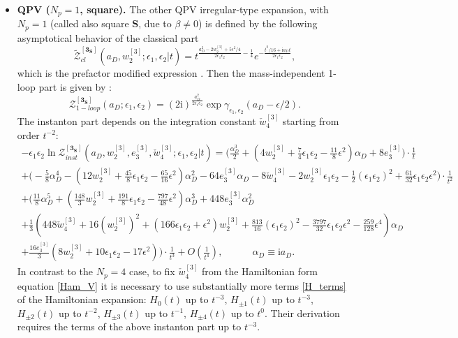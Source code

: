 \documentclass[12pt,a4paper]{article}
\numberwithin{equation}{section}
\newcommand{\ri}{\mathrm{i}}
\newcommand{\D}{\scriptscriptstyle{D}}
\begin{document}
\begin{itemize}
    \item {\bf QPV ($N_p=1$, square).}
The other QPV irregular-type expansion, with $N_p=1$ (called also square $\mathbf{S}$, due to $\beta\neq0$) is defined by the following asymptotical behavior of the classical part 
\begin{equation}
\widetilde{\mathcal{Z}}_{cl}^{[\mathbf{3_S}]}(a_{\D},w_2^{[3]};\epsilon_1,\epsilon_2|t)=t^{\frac{a_{\D}^2-2w_2^{[3]}+5\epsilon^2/4}{2\epsilon_1\epsilon_2}-\frac14}e^{-\frac{t^2/16+\ri a_{\D}t}{2\epsilon_1\epsilon_2}},
   \end{equation}  
which is the prefactor modified expression \cite[(4.25)]{BST25}. 
Then the mass-independent 1-loop part is given by \cite[(4.34)]{BST25}:    
\begin{equation}
\mathcal{Z}_{1-loop}^{[\mathbf{3_S}]}(a_{\D};\epsilon_1,\epsilon_2)=(2\ri)^{\frac{a_{\D}^2}{2\epsilon_1\epsilon_2}}  \exp \gamma_{\epsilon_1,\epsilon_2} (a_{\D}-\epsilon/2). 
\end{equation}
The instanton part \cite[(4.30)]{BST25} depends on the integration constant $\check{w}_4^{[3]}$ starting from order $t^{-2}$: 
\begin{multline}
-\epsilon_1\epsilon_2 \ln \mathcal{Z}_{inst}^{[\mathbf{3_S}]}(a_{\D},w_2^{[3]},e_3^{[3]},\check{w}_4^{[3]};\epsilon_1,\epsilon_2|t)=\Bigg(\frac{\alpha_{\D}^3}2+\left(4w_2^{[3]}{+}\frac74\epsilon_1\epsilon_2{-}\frac{11}8\epsilon^2\right)\alpha_{\D}+8e_3^{[3]}\Bigg)\cdot\frac1{t}\\+\Bigg(-\frac58\alpha_{\D}^4-\left(12w_2^{[3]}{+}\frac{45}8\epsilon_1\epsilon_2{-}\frac{65}{16}\epsilon^2\right)\alpha_{\D}^2-64e_3^{[3]}\alpha_{\D}-8\check{w}_4^{[3]}{-}2w_2^{[3]}\epsilon_1\epsilon_2{-}\frac12(\epsilon_1\epsilon_2)^2{+}\frac{61}{32}\epsilon_1\epsilon_2\epsilon^2\Bigg)\cdot\frac1{t^2}\\+\Bigg(\frac{11}8\alpha_{\D}^5+\left(\frac{148}3w_2^{[3]}{+}\frac{191}8\epsilon_1\epsilon_2{-}\frac{797}{48}\epsilon^2\right)\alpha_{\D}^3+448e_3^{[3]}\alpha_{\D}^2 \\ +\frac13\left(448\check{w}_4^{[3]}{+}16(w_2^{[3]})^2{+}(166\epsilon_1\epsilon_2{+}\epsilon^2)w_2^{[3]}{+}\frac{813}{16}(\epsilon_1\epsilon_2)^2{-}\frac{3797}{32}\epsilon_1\epsilon_2\epsilon^2{-}\frac{259}{128}\epsilon^4\right)\alpha_{\D}\\+\frac{16e_3^{[3]}}{3}(8w_2^{[3]}{+}10\epsilon_1\epsilon_2{-}17\epsilon^2)\Bigg)\cdot\frac1{t^3}+O\left(\frac1{t^4}\right), \qquad \quad \alpha_{\D}\equiv\ri a_{\D}.  
\end{multline}
In contrast to the $N_p=4$ case, to fix $\check{w}_4^{[3]}$ from the Hamiltonian form equation \eqref{Ham_V} it is necessary to use substantially more terms \eqref{H_terms} of the Hamiltonian expansion: $H_0(t)$ up to $t^{-3}$, $H_{\pm1}(t)$ up to $t^{-3}$, $H_{\pm2}(t)$ up to $t^{-2}$, $H_{\pm3}(t)$ up to $t^{-1}$, $H_{\pm4}(t)$ up to $t^0$. Their derivation requires the terms of the above instanton part up to $t^{-3}$. 

\end{itemize}
\end{document}
